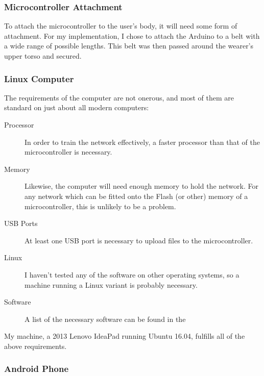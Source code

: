 \documentclass[a4paper]{article}
\begin{document}

\subsubsection{Microcontroller Attachment}

To attach the microcontroller to the user's body, it will need some form of attachment. For my implementation, I chose to attach the Arduino to a belt with a wide range of possible lengths. This belt was then passed around the wearer's upper torso and secured. 



\subsubsection{Linux Computer}

The requirements of the computer are not onerous, and most of them are standard on just about all modern computers:

\begin{description}
\item[Processor] In order to train the network effectively, a faster processor than that of the microcontroller is necessary. 
\item[Memory] Likewise, the computer will need enough memory to hold the network. For any network which can be fitted onto the Flash (or other) memory of a microcontroller, this is unlikely to be a problem.
\item[USB Ports] At least one USB port is necessary to upload files to the microcontroller.
\item[Linux] I haven't tested any of the software on other operating systems, so a machine running a Linux variant is probably necessary.
\item[Software] A list of the necessary software can be found in the 
\end{description}

My machine, a 2013 Lenovo IdeaPad running Ubuntu 16.04, fulfills all of the above requirements.


\subsubsection{Android Phone}
\end{document}
